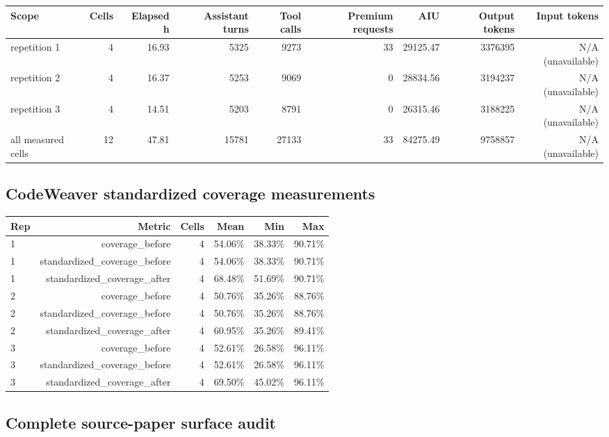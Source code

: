 \documentclass{article}
\begin{document}
\begin{tabular}{lrrrrrrrr}
\toprule
Scope & Cells & Elapsed h & Assistant turns & Tool calls & Premium requests & AIU & Output tokens & Input tokens \\
\midrule
repetition 1 & 4 & 16.93 & 5325 & 9273 & 33 & 29125.47 & 3376395 & N/A (unavailable) \\
repetition 2 & 4 & 16.37 & 5253 & 9069 & 0 & 28834.56 & 3194237 & N/A (unavailable) \\
repetition 3 & 4 & 14.51 & 5203 & 8791 & 0 & 26315.46 & 3188225 & N/A (unavailable) \\
all measured cells & 12 & 47.81 & 15781 & 27133 & 33 & 84275.49 & 9758857 & N/A (unavailable) \\
\bottomrule
\end{tabular}

\subsection*{CodeWeaver standardized coverage measurements}

\begin{tabular}{lrrrrr}
\toprule
Rep & Metric & Cells & Mean & Min & Max \\
\midrule
1 & coverage\_before & 4 & 54.06\% & 38.33\% & 90.71\% \\
1 & standardized\_coverage\_before & 4 & 54.06\% & 38.33\% & 90.71\% \\
1 & standardized\_coverage\_after & 4 & 68.48\% & 51.69\% & 90.71\% \\
2 & coverage\_before & 4 & 50.76\% & 35.26\% & 88.76\% \\
2 & standardized\_coverage\_before & 4 & 50.76\% & 35.26\% & 88.76\% \\
2 & standardized\_coverage\_after & 4 & 60.95\% & 35.26\% & 89.41\% \\
3 & coverage\_before & 4 & 52.61\% & 26.58\% & 96.11\% \\
3 & standardized\_coverage\_before & 4 & 52.61\% & 26.58\% & 96.11\% \\
3 & standardized\_coverage\_after & 4 & 69.50\% & 45.02\% & 96.11\% \\
\bottomrule
\end{tabular}

\subsection*{Complete source-paper surface audit}
\end{document}
